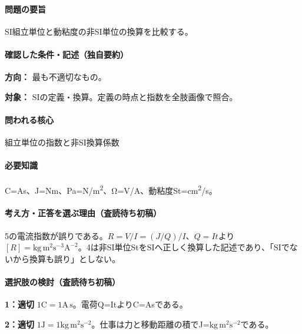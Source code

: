 \paragraph{問題の要旨} SI組立単位と動粘度の非SI単位の換算を比較する。

\paragraph{確認した条件・記述（独自要約）}\mbox{}\par

\noindent\textbf{方向：} 最も不適切なもの。\par

\noindent\textbf{対象：} SIの定義・換算。定義の時点と指数を全肢画像で照合。\par

\paragraph{問われる核心} 組立単位の指数と非SI換算係数

\paragraph{必要知識} C=\allowbreak{}As、J=\allowbreak{}Nm、Pa=\allowbreak{}N/m\textsuperscript{2}、Ω=V/A、動粘度St=\allowbreak{}cm\textsuperscript{2}/s。

\paragraph{考え方・正答を選ぶ理由（査読待ち初稿）} 5の電流指数が誤りである。\(R=V/I=(J/Q)/I\)、\(Q=It\)より\([R]=\mathrm{kg\,m^2s^{-3}A^{-2}}\)。4は非SI単位StをSIへ正しく換算した記述であり、「SIでないから換算も誤り」としない。

\paragraph{選択肢の検討（査読待ち初稿）}\mbox{}\par

\noindent\textbf{1：適切} \(1\mathrm{C}=1\mathrm{A\,s}\)。電荷Q=\allowbreak{}ItよりC=\allowbreak{}Asである。\par

\noindent\textbf{2：適切} \(1\mathrm{J}=1\mathrm{kg\,m^2s^{-2}}\)。仕事は力と移動距離の積でJ=\(\mathrm{kg\,m^2s^{-2}}\)である。\par

